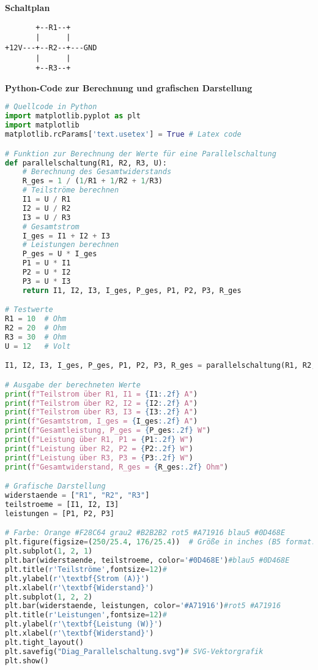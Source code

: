 \documentclass[12pt,a4paper]{scrartcl}
\begin{document}
\textbf{Schaltplan}

\begin{lstlisting}
       +--R1--+
       |      |
+12V---+--R2--+---GND
       |      |
       +--R3--+
\end{lstlisting}

\newpage

\textbf{Python-Code zur Berechnung und grafischen Darstellung}

\begin{lstlisting}[language=Python]
# Quellcode in Python
import matplotlib.pyplot as plt
import matplotlib 
matplotlib.rcParams['text.usetex'] = True # Latex code

# Funktion zur Berechnung der Werte für eine Parallelschaltung
def parallelschaltung(R1, R2, R3, U):
    # Berechnung des Gesamtwiderstands
    R_ges = 1 / (1/R1 + 1/R2 + 1/R3)
    # Teilströme berechnen
    I1 = U / R1
    I2 = U / R2
    I3 = U / R3
    # Gesamtstrom
    I_ges = I1 + I2 + I3
    # Leistungen berechnen
    P_ges = U * I_ges
    P1 = U * I1
    P2 = U * I2
    P3 = U * I3
    return I1, I2, I3, I_ges, P_ges, P1, P2, P3, R_ges

# Testwerte
R1 = 10  # Ohm
R2 = 20  # Ohm
R3 = 30  # Ohm
U = 12   # Volt

I1, I2, I3, I_ges, P_ges, P1, P2, P3, R_ges = parallelschaltung(R1, R2, R3, U)

# Ausgabe der berechneten Werte
print(f"Teilstrom über R1, I1 = {I1:.2f} A")
print(f"Teilstrom über R2, I2 = {I2:.2f} A")
print(f"Teilstrom über R3, I3 = {I3:.2f} A")
print(f"Gesamtstrom, I_ges = {I_ges:.2f} A")
print(f"Gesamtleistung, P_ges = {P_ges:.2f} W")
print(f"Leistung über R1, P1 = {P1:.2f} W")
print(f"Leistung über R2, P2 = {P2:.2f} W")
print(f"Leistung über R3, P3 = {P3:.2f} W")
print(f"Gesamtwiderstand, R_ges = {R_ges:.2f} Ohm")

# Grafische Darstellung
widerstaende = ["R1", "R2", "R3"]
teilstroeme = [I1, I2, I3]
leistungen = [P1, P2, P3]

# Farbe: Orange #F28C64 grau2 #B2B2B2 rot5 #A71916 blau5 #0D468E
plt.figure(figsize=(250/25.4, 176/25.4))  # Größe in inches (B5 format: 250mm x 176mm)plt.figure(figsize=(12, 5))
plt.subplot(1, 2, 1)
plt.bar(widerstaende, teilstroeme, color='#0D468E')#blau5 #0D468E
plt.title(r'Teilströme',fontsize=12)#
plt.ylabel(r'\textbf{Strom (A)}')
plt.xlabel(r'\textbf{Widerstand}')
plt.subplot(1, 2, 2)
plt.bar(widerstaende, leistungen, color='#A71916')#rot5 #A71916
plt.title(r'Leistungen',fontsize=12)#
plt.ylabel(r'\textbf{Leistung (W)}')
plt.xlabel(r'\textbf{Widerstand}')
plt.tight_layout()
plt.savefig("Diag_Parallelschaltung.svg")# SVG-Vektorgrafik
plt.show()
\end{lstlisting}
\end{document}
